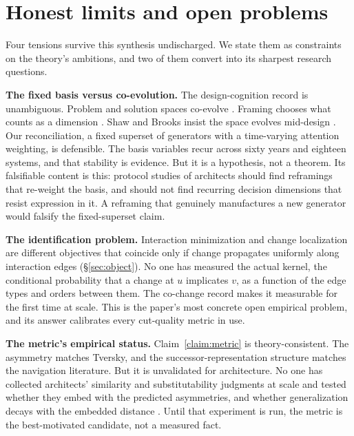 \documentclass[11pt,oneside]{article}
\theoremstyle{definition}
\begin{document}
\section{Honest limits and open problems}\label{sec:limits}

Four tensions survive this synthesis undischarged. We state them as constraints on the theory's
ambitions, and two of them convert into its sharpest research questions.

\textbf{The fixed basis versus co-evolution.} The design-cognition record is unambiguous.
Problem and solution spaces co-evolve \cite{dorstcross2001}. Framing chooses what counts as a
dimension \cite{schon1983}. Shaw and Brooks insist the space evolves mid-design
\cite{shaw2012,brooks2010}. Our reconciliation, a fixed superset of generators with a
time-varying attention weighting, is defensible. The basis variables recur across sixty years
and eighteen systems, and that stability is evidence. But it is a hypothesis, not a theorem.
Its falsifiable content is this: protocol studies of architects should find reframings that
re-weight the basis, and should not find recurring decision dimensions that resist expression
in it. A reframing that genuinely manufactures a new generator would falsify the fixed-superset
claim.

\textbf{The identification problem.} Interaction minimization and change localization are
different objectives that coincide only if change propagates uniformly along interaction edges
(\S\ref{sec:object}). No one has measured the actual kernel, the conditional probability that a
change at $u$ implicates $v$, as a function of the edge types and orders between them. The
co-change record makes it measurable for the first time at scale. This is the paper's most
concrete open empirical problem, and its answer calibrates every cut-quality metric in use.

\textbf{The metric's empirical status.} Claim~\ref{claim:metric} is theory-consistent. The
asymmetry matches Tversky, and the successor-representation structure matches the navigation
literature. But it is unvalidated for architecture. No one has collected architects' similarity
and substitutability judgments at scale and tested whether they embed with the predicted
asymmetries, and whether generalization decays with the embedded distance \cite{shepard1987}.
Until that experiment is run, the metric is the best-motivated candidate, not a measured fact.
\end{document}
